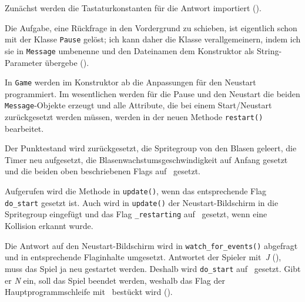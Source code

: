 Zunächst werden die Tastaturkonstanten für die Antwort importiert ().


Die Aufgabe, eine Rückfrage in den Vordergrund zu schieben, ist eigentlich schon mit der Klasse \texttt{Pause} gelöst; ich kann daher die Klasse verallgemeinern, indem ich sie in \texttt{Message} umbenenne und den Dateinamen dem Konstruktor als String-Parameter übergebe ().



In \texttt{Game} werden im Konstruktor ab  die Anpassungen für den Neustart programmiert. Im wesentlichen werden für die Pause und den Neustart die beiden \texttt{Message}-Objekte erzeugt und alle Attribute, die bei einem Start/Neustart zurückgesetzt werden müssen, werden in der neuen Methode \texttt{restart()} bearbeitet.

\newpage
{}  

Der Punktestand wird zurückgesetzt, die Spritegroup von den Blasen geleert, die Timer neu aufgesetzt, die Blasenwachstumsgeschwindigkeit auf Anfang gesetzt und die beiden oben beschriebenen Flags auf \false\ gesetzt.



Aufgerufen wird die Methode in \texttt{update()}, wenn das entsprechende Flag \texttt{do\_start} gesetzt ist. Auch wird in \texttt{update()} der Neustart-Bildschirm in die Spritegroup eingefügt und das Flag \texttt{\_restarting} auf \true\ gesetzt, wenn eine Kollision erkannt wurde. 



Die Antwort auf den Neustart-Bildschirm wird in \texttt{watch\_for\_events()} abgefragt und in entsprechende Flaginhalte umgesetzt. Antwortet der Spieler mit~\emph{J} (), muss das Spiel ja neu gestartet werden. Deshalb wird \texttt{do\_start} auf \true\ gesetzt. Gibt er \emph{N} ein, soll das Spiel beendet werden, weshalb das Flag der Hauptprogrammschleife mit \false\ bestückt wird ().

